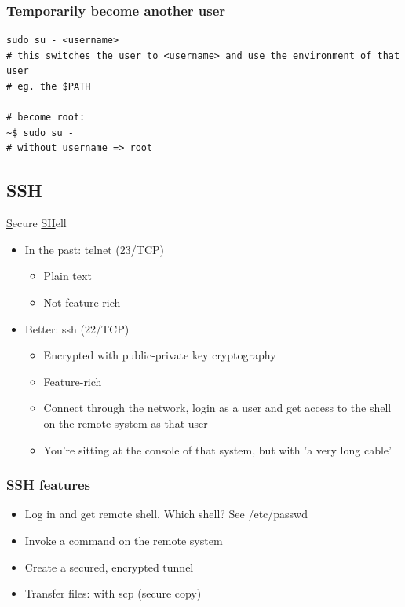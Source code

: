 \documentclass{article}
\begin{document}
\subsubsection{Temporarily become another user}

\begin{verbatim}
sudo su - <username>
# this switches the user to <username> and use the environment of that user
# eg. the $PATH

# become root:
~$ sudo su -
# without username => root
\end{verbatim}


\subsection{SSH}

\underline{S}ecure \underline{SH}ell

\begin{itemize}
    \item In the past: telnet (23/TCP)
    \begin{itemize}
        \item Plain text
        \item Not feature-rich
    \end{itemize}
    \item Better: ssh (22/TCP)
    \begin{itemize}
        \item Encrypted with public-private key cryptography
        \item Feature-rich
        \item Connect through the network, login as a user and get access to the shell on the remote system as that user
        \item You're sitting at the console of that system, but with 'a very long cable'
    \end{itemize}
\end{itemize}

\subsubsection{SSH features}

\begin{itemize}
    \item Log in and get remote shell. Which shell? See /etc/passwd
    \item Invoke a command on the remote system
    \item Create a secured, encrypted tunnel
    \item Transfer files: with scp (secure copy)
\end{itemize}
\end{document}
